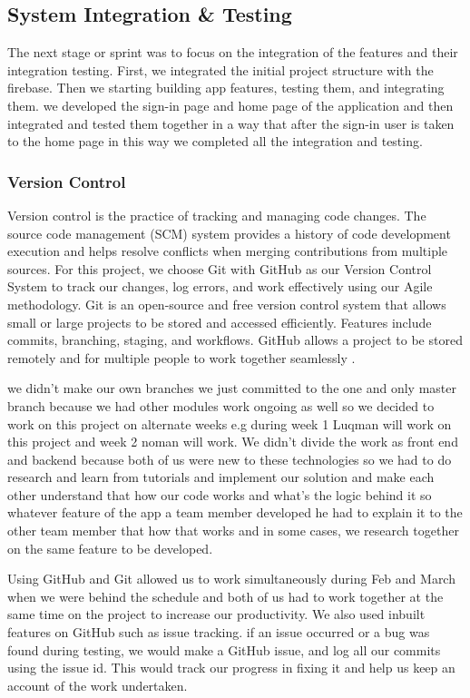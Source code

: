 \subsection{System Integration \& Testing}
The next stage or sprint was to focus on the integration of the features and their integration testing. First, we integrated the initial project structure with the firebase. Then we starting building app features, testing them, and integrating them. we developed the sign-in page and home page of the application and then integrated and tested them together in a way that after the sign-in user is taken to the home page in this way we completed all the integration and testing. 

\subsubsection{Version Control}
Version control is the practice of tracking and managing code changes. The source code management (SCM) system provides a history of code development execution and helps resolve conflicts when merging contributions from multiple sources. For this
project, we choose Git with GitHub as our Version Control System to track our changes, log errors, and work effectively using our Agile methodology. Git is an open-source and free version control system that allows small or large projects to be stored and accessed efficiently. Features include commits, branching, staging, and workflows. GitHub allows a project to be stored remotely and for multiple people to work together seamlessly \cite{GitHub:online}.

we didn't make our own branches we just committed to the one and only master branch because we had other modules work ongoing as well so we decided to work on this project on alternate weeks e.g during week 1 Luqman will work on this project and week 2 noman will work. We didn't divide the work as front end and backend because both of us were new to these technologies so we had to do research and learn from tutorials and implement our solution and make each other understand that how our code works and what's the logic behind it so whatever feature of the app a team member developed he had to explain it to the other team member that how that works and in some cases, we research together on the same feature to be developed.

Using GitHub and Git allowed us to work simultaneously during Feb and March when we were behind the schedule and both of us had to work together at the same time on the project to increase our productivity. We also used inbuilt features on GitHub such as issue tracking. if an issue occurred or a bug was found during testing, we would make a GitHub issue, and log all our commits using the issue id. This would track our progress in fixing it and help us keep an account of the work undertaken.

